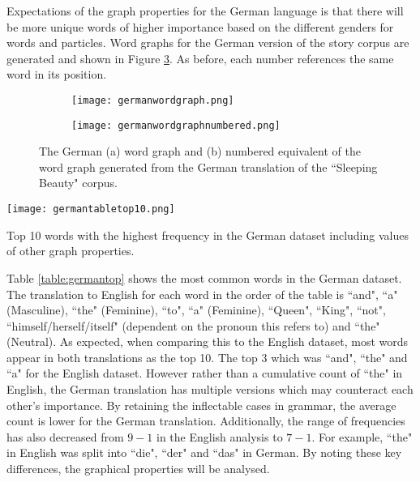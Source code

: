 Expectations of the graph properties for the German language is that there will be more unique words of higher importance based on the different genders for words and particles. Word graphs for the German version of the story corpus are generated and shown in Figure \ref{fig:gergraph}. As before, each number references the same word in its position.

\begin{figure}[!htb]
\centering
\begin{subfigure}{.45\textwidth}
	\texttt{[image: germanwordgraph.png]}
	\caption{}
	\label{fig:gerword}
\end{subfigure}
\hfill
\begin{subfigure}{.45\textwidth}
	\hspace{-2cm} 
	\texttt{[image: germanwordgraphnumbered.png]}
	\caption{}
	\label{fig:gernum}
\end{subfigure}
\caption{The German (a) word graph and (b) numbered equivalent of the word graph generated from the German translation of the ``Sleeping Beauty" corpus.}
\label{fig:gergraph}
\end{figure}

\begin{table}[!htb]
\centering
\texttt{[image: germantabletop10.png]}
\caption{Top 10 words with the highest frequency in the German dataset including values of other graph properties. }
\label{table:germantop}
\end{table}

Table \ref{table:germantop} shows the most common words in the German dataset. The translation to English for each word in the order of the table is ``and", ``a" (Masculine), ``the" (Feminine), ``to", ``a" (Feminine), ``Queen", ``King", ``not", ``himself/herself/itself" (dependent on the pronoun this refers to) and ``the" (Neutral). As expected, when comparing this to the English dataset, most words appear in both translations as the top 10. The top 3 which was ``and", ``the" and ``a" for the English dataset. However rather than a cumulative count of ``the" in English, the German translation has multiple versions which may counteract each other's importance. By retaining the inflectable cases in grammar, the average count is lower for the German translation. Additionally, the range of frequencies has also decreased from $9-1$ in the English analysis to $7-1$. For example, ``the" in English was split into ``die", ``der" and ``das" in German. By noting these key differences, the graphical properties will be analysed.


